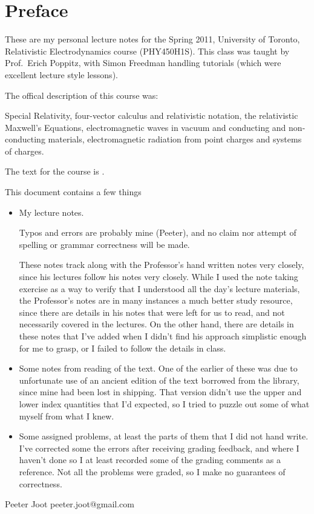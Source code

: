 \chapter*{Preface}\normalsize

These are my personal lecture notes for the Spring 2011, University of Toronto, Relativistic Electrodynamics course (PHY450H1S).  This class was taught by Prof.\ Erich Poppitz, with Simon Freedman handling tutorials (which were excellent lecture style lessons).

The offical description of this course was:

Special Relativity, four-vector calculus and relativistic notation, the relativistic Maxwell's Equations, electromagnetic waves in vacuum and conducting and non-conducting materials, electromagnetic radiation from point charges and systems of charges.

The text for the course is \citep{landau1980classical}.

This document contains a few things

\begin{itemize}
\item My lecture notes.

Typos and errors are probably mine (Peeter), and no claim nor attempt of spelling or grammar correctness will be made.  

These notes track along with the Professor's hand written notes very closely, since his lectures follow his notes very closely.  While I used the note taking exercise as a way to verify that I understood all the day's lecture materials, the Professor's notes are in many instances a much better study resource, since there are details in his notes that were left for us to read, and not necessarily covered in the lectures.  On the other hand, there are details in these notes that I've added when I didn't find his approach simplistic enough for me to grasp, or I failed to follow the details in class.

\item Some notes from reading of the text.  One of the earlier of these was due to unfortunate use of an ancient edition of the text borrowed from the library, since mine had been lost in shipping.  That version didn't use the upper and lower index quantities that I'd expected, so I tried to puzzle out some of what myself from what I knew.

\item Some assigned problems, at least the parts of them that I did not hand write.  I've corrected some the errors after receiving grading feedback, and where I haven't done so I at least recorded some of the grading comments as a reference.  Not all the problems were graded, so I make no guarantees of correctness.

%
\end{itemize}

Peeter Joot  \quad peeter.joot@gmail.com 
